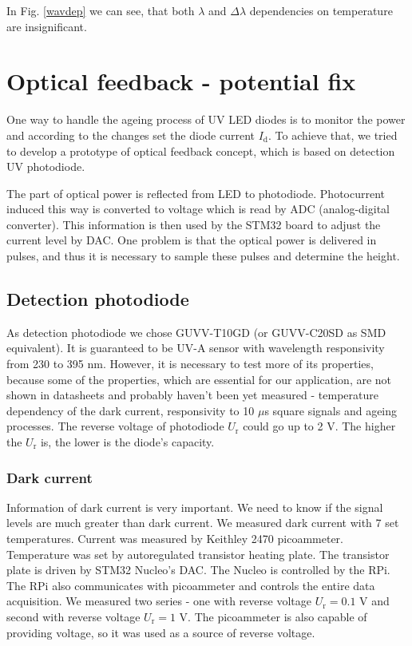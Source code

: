 In Fig. \ref{wavdep} we can see, that both $\lambda$ and $\Delta \lambda$ dependencies on temperature are insignificant.

\section{Optical feedback - potential fix}
One way to handle the ageing process of UV LED diodes is to monitor the power and according to the changes set the diode current $I_\textrm{d}$. To achieve that, we tried to develop a prototype of optical feedback concept, which is based on detection UV photodiode. 
\par
The part of optical power is reflected from LED to photodiode. Photocurrent induced this way is converted to voltage which is read by ADC (analog-digital converter). This information is then used by the STM32 board to adjust the current level by DAC. One problem is that the optical power is delivered in pulses, and thus it is necessary to sample these pulses and determine the height.
\par
\subsection{Detection photodiode}
As detection photodiode we chose GUVV-T10GD (or GUVV-C20SD as SMD equivalent). It is guaranteed to be UV-A sensor with wavelength responsivity from 230 to 395 nm. However, it is necessary to test more of its properties, because some of the properties, which are essential for our application, are not shown in datasheets and probably haven't been yet measured - temperature dependency of the dark current, responsivity to 10 $\mu$s square signals and ageing processes. The reverse voltage of photodiode $U_\textrm{r}$ could go up to 2 V. The higher the $U_\textrm{r}$ is, the lower is the diode's capacity.
\par
\subsubsection{Dark current}
Information of dark current is very important. We need to know if the signal levels are much greater than dark current. We measured dark current with 7 set temperatures. Current was measured by Keithley 2470 picoammeter. Temperature was set by autoregulated transistor heating plate. The transistor plate is driven by STM32 Nucleo's DAC. The Nucleo is controlled by the RPi. The RPi also communicates with picoammeter and controls the entire data acquisition. We measured two series - one with reverse voltage $U_\textrm{r} = 0.1$ V and second with reverse voltage $U_\textrm{r} = 1$ V. The picoammeter is also capable of providing voltage, so it was used as a source of reverse voltage.

